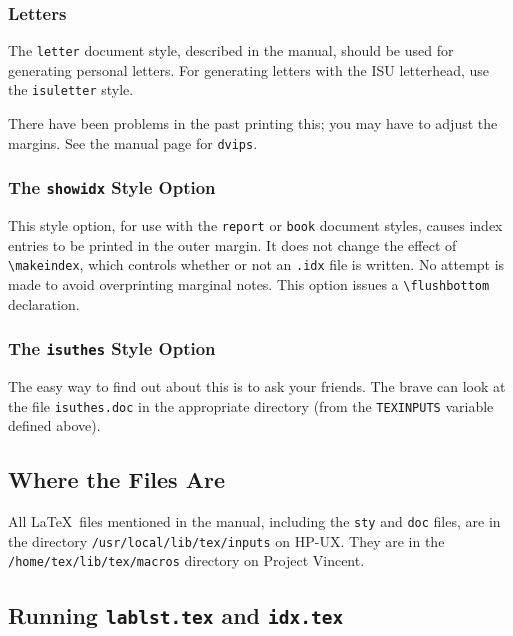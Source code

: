 \subsubsection{Letters} \label{sec:letters}

The \mbox{\tt letter} document style, described in the manual, should
be used for generating personal letters.  For generating letters with the
ISU letterhead, use the \mbox{\tt isuletter} style.

There have been problems in the past printing this;
you may have to adjust the margins.
See the manual page for {\tt dvips}.

\subsubsection{The {\tt showidx} Style Option}

This style option, for use with the {\tt report} or {\tt book} document
styles, causes index entries to be printed in the outer margin.  It
does not change the effect of \verb|\makeindex|, which controls
whether or not an {\tt .idx} file is written.  No attempt is made to
avoid overprinting marginal notes.  This option issues a 
\verb|\flushbottom| declaration.

\subsubsection{The {\tt isuthes} Style Option}

The easy way to find out about this is to ask your friends.
The brave can look at the file {\tt isuthes.doc} in the appropriate
directory (from the {\tt TEXINPUTS} variable defined above).


\subsection{Where the Files Are}

%

All \LaTeX\ files mentioned in the manual, including the {\tt sty} and
{\tt doc} files, are in the directory \mbox{\tt /usr/local/lib/tex/inputs}
on HP-UX.  They are in the  \mbox{\tt /home/tex/lib/tex/macros} directory
on Project Vincent.

\subsection{Running {\tt lablst.tex} and {\tt idx.tex}}

